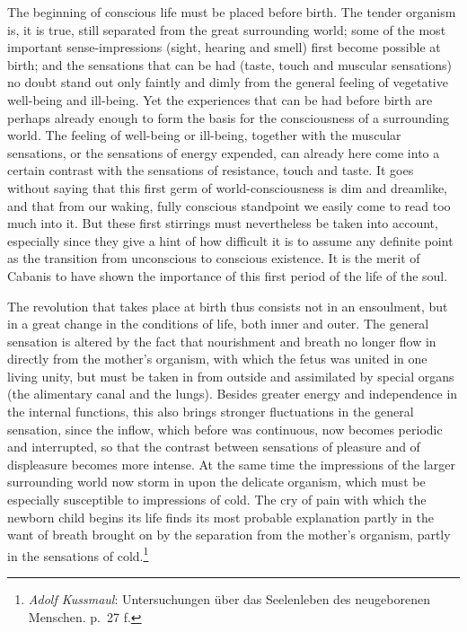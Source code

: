 \documentclass[12pt,a4paper]{book}
\newcommand{\opage}[1]{\marginnote{\footnotesize\textit{[#1]}}}
\begin{document}
The beginning of conscious life must be placed before birth. The tender
organism is, it is true, still separated from the great surrounding
world; some of the most important sense-impressions (sight, hearing and
smell) first become possible at birth; and the sensations that can be
had (taste, touch and muscular sensations) no doubt stand out only
faintly and dimly from the general feeling of vegetative well-being and
ill-being. Yet the experiences that can be had before birth are perhaps
already enough to form the basis for the consciousness of a surrounding
world. The feeling of well-being or ill-being, together with the
muscular sensations, or the sensations of energy expended, can already
here come into a certain contrast with the sensations of resistance,
touch and taste. It goes without saying that this first germ of
world-consciousness is dim and dreamlike, and that from our waking,
fully conscious standpoint we easily come to read too much into it. But
these first stirrings must nevertheless be taken into account,
especially since they give a hint of how
\opage{4}difficult it is to assume any definite point as the transition
from unconscious to conscious existence. It is the merit of
Cabanis to have shown the importance of this first period of the
life of the soul.

The revolution that takes place at birth thus consists not in an
ensoulment, but in a great change in the conditions of life, both inner
and outer. The general sensation is altered by the fact that nourishment
and breath no longer flow in directly from the mother's organism, with
which the fetus was united in one living unity, but must be taken in
from outside and assimilated by special organs (the alimentary canal and
the lungs). Besides greater energy and independence in the internal
functions, this also brings stronger fluctuations in the general
sensation, since the inflow, which before was continuous, now becomes
periodic and interrupted, so that the contrast between sensations of
pleasure and of displeasure becomes more intense. At the same time the
impressions of the larger surrounding world now storm in upon the
delicate organism, which must be especially susceptible to impressions
of cold. The cry of pain with which the newborn child begins its life
finds its most probable explanation partly in the want of breath brought
on by the separation from the mother's organism, partly in the
sensations of cold.\footnote{\emph{Adolf Kussmaul}: Untersuchungen über
das Seelenleben des neugeborenen Menschen. p.~27 f.}
\end{document}
